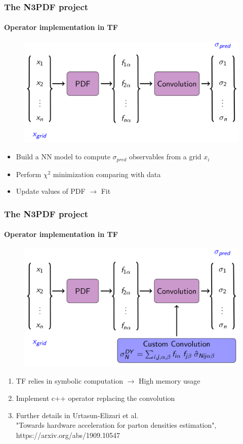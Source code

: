 \documentclass[aspectratio=43]{beamer}
\begin{document}
\begin{frame}

	\frametitle{The N3PDF project}
	\framesubtitle{Operator implementation in TF}
	
	\begin{figure}
		\includegraphics[width = 8.5 cm]{plots/section2/TF_convolution.png}
	\end{figure}


	\begin{itemize}
		\item \footnotesize Build a NN model to compute $\sigma_{pred}$ observables from a grid $x_{i}$
		\item \footnotesize Perform $\chi^{2}$ minimization comparing with data
		\item \footnotesize Update values of PDF $\longrightarrow$ {\color{violet} Fit}
	\end{itemize}

\end{frame}

\begin{frame}

	\frametitle{The N3PDF project}
	\framesubtitle{Operator implementation in TF}
		
	\begin{figure}
		\includegraphics[width = 8.5 cm]{plots/section2/TF_convolution2.png}
	\end{figure}

	\begin{enumerate}
		\item \footnotesize TF relies in symbolic computation $\longrightarrow$ High memory usage
		\item \footnotesize Implement c++ operator replacing the convolution
		\item Further details in Urtasun-Elizari et al.\\
		{\color{blue}"Towards hardware acceleration for parton densities estimation",\\ https://arxiv.org/abs/1909.10547}
	\end{enumerate}

\end{frame}
\end{document}
